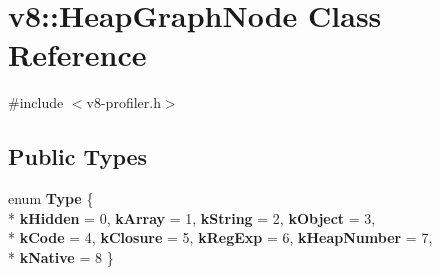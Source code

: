 \hypertarget{classv8_1_1_heap_graph_node}{}\section{v8\+:\+:Heap\+Graph\+Node Class Reference}
\label{classv8_1_1_heap_graph_node}


{\ttfamily \#include $<$v8-\/profiler.\+h$>$}

\subsection*{Public Types}
\begin{DoxyCompactItemize}
\item 
\hypertarget{classv8_1_1_heap_graph_node_ab674a58103a51abc56f99edc6a1479ed}{}enum {\bfseries Type} \{ \\*
{\bfseries k\+Hidden} = 0, 
{\bfseries k\+Array} = 1, 
{\bfseries k\+String} = 2, 
{\bfseries k\+Object} = 3, 
\\*
{\bfseries k\+Code} = 4, 
{\bfseries k\+Closure} = 5, 
{\bfseries k\+Reg\+Exp} = 6, 
{\bfseries k\+Heap\+Number} = 7, 
\\*
{\bfseries k\+Native} = 8
 \}\label{classv8_1_1_heap_graph_node_ab674a58103a51abc56f99edc6a1479ed}

\end{DoxyCompactItemize}
